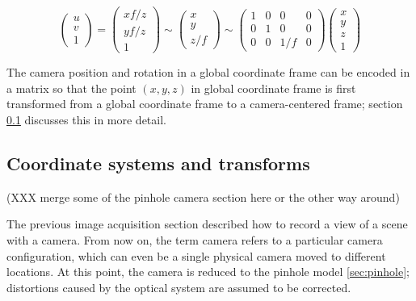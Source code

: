 \begin{equation}
\begin{pmatrix}
u \\ v \\ 1
\end{pmatrix}
=
\begin{pmatrix}
xf/z \\ yf/z \\ 1
\end{pmatrix}
\sim
\begin{pmatrix}
x \\ y \\ z/f
\end{pmatrix}
\sim
\begin{pmatrix} \label{eq:cmat}
	1 & 0 & 0 & 0 \\
	0 & 1 & 0 & 0 \\
	0 & 0 & 1/f & 0
\end{pmatrix}
\begin{pmatrix}
x \\ y \\ z \\ 1
\end{pmatrix}
\end{equation}

The camera position and rotation in a global coordinate frame can be encoded in a matrix so that the point $(x,y,z)$ in global coordinate frame is first transformed from a global coordinate frame to a camera-centered frame; section \ref{sec:coord} discusses this in more detail.


\subsection{Coordinate systems and transforms} \label{sec:coord} %

(XXX merge some of the pinhole camera section here or the other way around)




The previous image acquisition section described how to record a view of a scene with a camera. From now on, the term camera refers to a particular camera configuration, which can even be a single physical camera moved to different locations.
At this point, the camera is reduced to the pinhole model \ref{sec:pinhole}; distortions caused by the optical system are assumed to be corrected.

